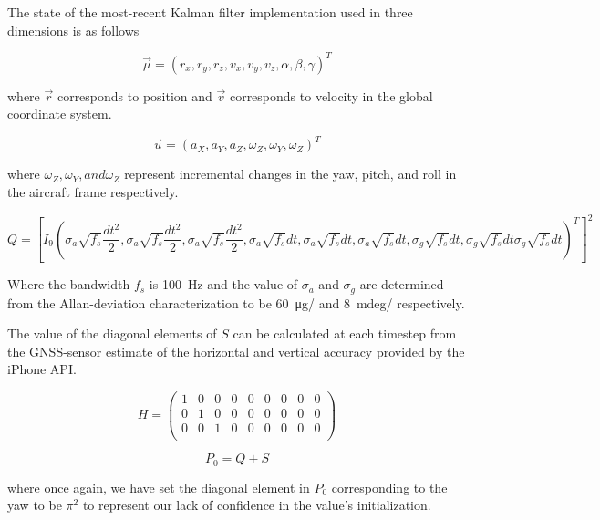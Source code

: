 \documentclass[10pt]{article}
\begin{document}
The state of the most-recent Kalman filter implementation used in three dimensions is as follows 

\begin{equation}
\vec\mu = (r_x, r_y, r_z, v_x, v_y, v_z, \alpha, \beta, \gamma)^T
\end{equation}

where $\vec r$ corresponds to position and $\vec v$ corresponds to velocity in the global coordinate system.

\begin{equation}
\vec{u} = (a_X, a_Y, a_Z, \omega_Z, \omega_Y, \omega_Z)^T
\end{equation}

where $\omega_Z, \omega_Y, and \omega_Z$ represent incremental changes in the yaw, pitch, and roll in the aircraft frame respectively.

\def\dts{\frac{dt^2}{2}}
\def\sga{\sigma_a\sqrt{f_s}}
\def\sgg{\sigma_g\sqrt{f_s}}

\begin{equation}
Q = \left[ I_9 \left(\sga\dts, \sga\dts, \sga\dts, \sga dt, \sga dt, \sga dt, \sgg dt, \sgg dt \sgg dt \right)^T \right]^2
\end{equation}

Where the bandwidth $f_s$ is \SI{100}{Hz} and the value of $\sigma_a$ and $\sigma_g$ are determined from the Allan-deviation characterization to be \SI{60}{\micro g/} and \SI{8}{mdeg/} respectively.

The value of the diagonal elements of $S$ can be calculated at each timestep from the GNSS-sensor estimate of the horizontal and vertical accuracy provided by the iPhone API.

\begin{equation}
H = \begin{pmatrix}
1 & 0 & 0 & 0 & 0 & 0 & 0 & 0 & 0 \\
0 & 1 & 0 & 0 & 0 & 0 & 0 & 0 & 0 \\
0 & 0 & 1 & 0 & 0 & 0 & 0 & 0 & 0 \\
\end{pmatrix}
\end{equation}

\begin{equation}
P_0 = Q + S
\end{equation}

where once again, we have set the diagonal element in $P_0$ corresponding to the yaw to be $\pi^2$ to represent our lack of confidence in the value's initialization.
\end{document}
